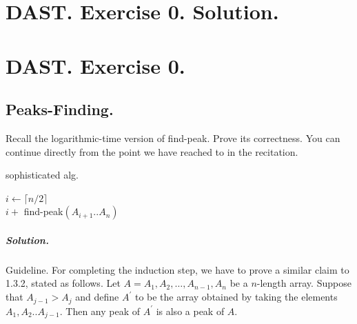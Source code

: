 


\newcommand*{\EXERCISE}{}%
%


 



\ifdefined\SOLUTION
  \chapter{DAST. Exercise 0. Solution.}
\else
  \chapter{DAST. Exercise 0.}
\fi
\section{Peaks-Finding.} Recall the logarithmic-time version of find-peak. Prove its correctness. You can continue directly from the point we have reached to in the recitation.

\begin{algorithm}
\caption{sophisticated alg.}
$ i \leftarrow  \lceil n/2 \rceil $\\
         { 
          \Return $i + $ find-peak$\left(A_{i+1}..A_{n}\right)$
        }
\end{algorithm}

\ifdefined\SOLUTION
  \paragraph{Solution.} Guideline. For completing the induction step, we have to prove a similar claim to 1.3.2, stated as follows. Let $A = A_{1},A_{2},\dots,A_{n-1},A_{n}$ be a $n$-length array. Suppose that $A_{j-1}>A_{j}$ and define $A^{\prime}$ to be the array obtained by taking the elements $A_{1},A_{2}..A_{j-1}$. Then any peak of $A^{\prime}$ is also a peak of $A$.
\fi


